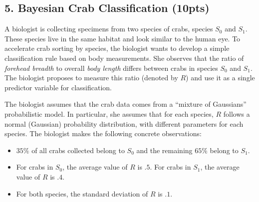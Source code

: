 \documentclass[10pt]{article}
\begin{document}
\newpage

\subsection{5. Bayesian Crab Classification (\textbf{\small 10pts})}
A biologist is collecting specimens from two species of crabs, species $S_0$ and $S_1$. These species live in the same habitat and look similar to the human eye. To accelerate crab sorting by species, the biologist wants to develop a simple classification rule based on body measurements. She observes that the ratio of \emph{forehead breadth} to overall \emph{body length} differs between crabs in species $S_0$ and $S_1$. The biologist proposes to measure this ratio (denoted by $R$) and use it as a single predictor variable for classification.

The biologist assumes that the crab data comes from a ``mixture of Gaussians'' probabilistic model. In particular, she assumes that for each species, $R$ follows a normal (Gaussian) probability distribution, with different parameters for each species. The biologist makes the following concrete observations:
\begin{itemize}
	\item $35\%$ of all crabs collected belong to $S_0$ and the remaining $65\%$ belong to $S_1$. 
	\item For crabs in $S_0$, the average value of $R$ is $.5$. For crabs in $S_1$, the average value of $R$ is $.4$. 
	\item For both species, the standard deviation of $R$ is $.1$.
\end{itemize}
\end{document}
